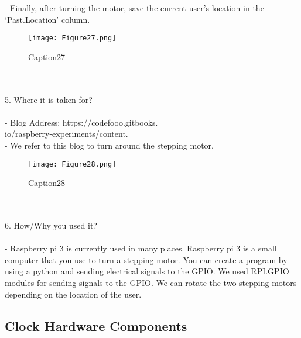 \documentclass[10pt,a4paper,twocolumn]{report}
\begin{document}
\begin{enumerate}
- Finally, after turning the motor, save the current user’s location in the ‘Past.Location’ column. \\
			\begin{figure} [h]
				\texttt{[image: Figure27.png]}
				\caption{Caption27}
				\label{fig27}
			\end{figure}
		\\\\
		5. Where it is taken for? \\ \\
- Blog Address: https://codefooo.gitbooks.\\io/raspberry-experiments/content. \\
- We refer to this blog to turn around the stepping motor. \\
			\begin{figure}[h]
				\texttt{[image: Figure28.png]}
				\caption{Caption28}
				\label{fig28}
			\end{figure}
		\\\\
		6. How/Why you used it? \\\\
		- Raspberry pi 3 is currently used in many places. Raspberry pi 3 is a small computer that you use to turn a stepping motor. You can create a program by using a python and sending electrical signals to the GPIO. We used RPI.GPIO modules for sending signals to the GPIO. We can rotate the two stepping motors depending on the location of the user.\\	
		\end{enumerate}
	\subsection{Clock Hardware Components}
\end{document}
